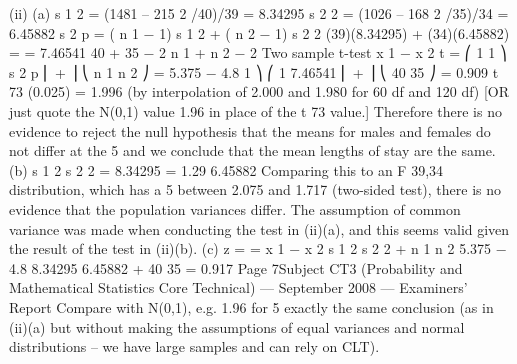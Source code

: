 (ii)
(a)
s 1 2 = (1481 – 215 2 /40)/39 = 8.34295
s 2 2 = (1026 – 168 2 /35)/34 = 6.45882
s 2 p =
( n 1 − 1) s 1 2 + ( n 2 − 1) s 2 2
(39)(8.34295) + (34)(6.45882)
=
= 7.46541
40 + 35 − 2
n 1 + n 2 − 2
Two sample t-test
x 1 − x 2
t =
⎛ 1 1 ⎞
s 2 p ⎜ + ⎟
⎝ n 1 n 2 ⎠
=
5.375 − 4.8
1 ⎞
⎛ 1
7.46541 ⎜ + ⎟
⎝ 40 35 ⎠
= 0.909
t 73 (0.025) = 1.996 (by interpolation of 2.000 and 1.980 for 60 df and
120 df)
[OR just quote the N(0,1) value 1.96 in place of the t 73 value.]
Therefore there is no evidence to reject the null hypothesis that the
means for males and females do not differ at the 5%
and we conclude that the mean lengths of stay are the same.
(b)
s 1 2
s 2 2
=
8.34295
= 1.29
6.45882
Comparing this to an F 39,34 distribution, which has a 5%
between 2.075 and 1.717 (two-sided test), there is no evidence that the
population variances differ.
The assumption of common variance was made when conducting the
test in (ii)(a), and this seems valid given the result of the test in (ii)(b).
(c)
z =
=
x 1 − x 2
s 1 2 s 2 2
+
n 1 n 2
5.375 − 4.8
8.34295 6.45882
+
40
35
= 0.917
Page 7Subject CT3 (Probability and Mathematical Statistics Core Technical) — September 2008 — Examiners’ Report
Compare with N(0,1), e.g. 1.96 for 5%
exactly the same conclusion (as in (ii)(a) but without making the
assumptions of equal variances and normal distributions – we have
large samples and can rely on CLT).
